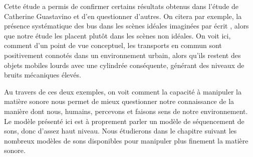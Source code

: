 Cette étude a permis de confirmer certains résultats obtenus dans l'étude de Catherine Guastavino et d'en questionner d'autres. On citera par exemple, la présence systématique des bus dans les scènes idéales imaginées \og par écrit \fg, alors que notre étude les placent plutôt dans les scènes non idéales. On voit ici, comment d'un point de vue conceptuel, les transports en commun sont positivement connotés dans un environnement urbain, alors qu'ils restent des objets mobiles lourds avec une cylindrée conséquente, générant des niveaux de bruits mécaniques élevés.~\cite{lafayhal-01111782}

Au travers de ces deux exemples, on voit comment la capacité à manipuler la matière sonore nous permet de mieux questionner notre connaissance de la manière dont nous, humains, percevons et faisons sens de notre environnement. Le modèle présenté ici est à proprement parler un modèle de séquencement de sons, donc d'assez haut niveau. Nous étudierons dans le chapitre suivant les nombreux modèles de sons disponibles pour manipuler plus finement la matière sonore. %


